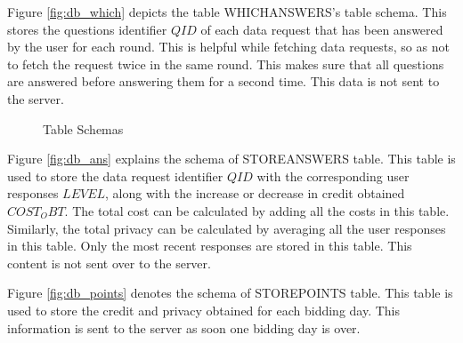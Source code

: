 Figure \ref{fig:db_which} depicts the table WHICHANSWERS's table schema. This stores the questions identifier $QID$ of each data request that has
been answered by the user for each round. This is helpful while fetching data requests, so as not to fetch the request twice in the same round. This makes sure that all questions are answered before answering them for a second time. This data is not sent to the server.

\begin{figure}[htp]
 \hspace{1em}
\caption{Table Schemas}
\label{fig:ts11}
\end{figure}

Figure \ref{fig:db_ans} explains the schema of STOREANSWERS table. This table is used to store the data request identifier $QID$ with the corresponding
user responses $LEVEL$, along with the increase or decrease in credit obtained $COST_OBT$. The total cost can be calculated by adding all the costs in this table. Similarly, the total privacy can be calculated by averaging all the user responses in this table. Only the most recent responses are stored in this table. This content is not sent over to the server.

Figure \ref{fig:db_points} denotes the schema of STOREPOINTS table. This table is used to store the credit and privacy obtained for each bidding day.
This information is sent to the server as soon one bidding day is over.

